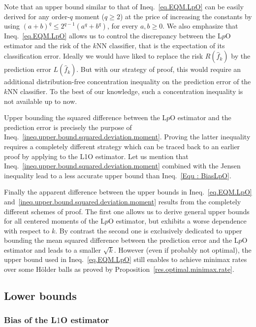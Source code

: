 \documentclass[twoside,11pt]{article}
\numberwithin{equation}{section}
\newcommand{\1}{\mathds{1}}%
\numberwithin{equation}{section}
\theoremstyle{plain}
\begin{document}
Note that an upper bound similar to that of Ineq.~\eqref{eq.EQM.LpO} can be easily derived for any order-$q$ moment ($q\geq 2$) at the price of increasing the constants by using $(a+b)^q \leq 2^{q-1} (a^q + b^q)$, for every $a,b\geq 0$.
%
We also emphasize that Ineq.~\eqref{eq.EQM.LpO} allows us to control the discrepancy between the L$p$O estimator and the risk of the $k$NN classifier, that is the expectation of its classification error.
%
Ideally we would have liked to replace the risk $R(\hat f_k)$ by the prediction error $L(\hat f_k)$. But with our strategy of proof, this would require an additional distribution-free concentration inequality on the prediction error of the $k$NN classifier. To the best of our knowledge, such a concentration inequality is not available up to now.


Upper bounding the squared difference between the L$p$O estimator and the prediction error is precisely the purpose of  Ineq.~\eqref{ineq.upper.bound.squared.deviation.moment}. Proving the latter inequality requires a completely different strategy which can be traced back to an earlier proof by \citet[][see the proof of Theorem~2.1]{RogersWagner78} applying to the L1O estimator.
%
Let us mention that Ineq.~\eqref{ineq.upper.bound.squared.deviation.moment} combined with the Jensen inequality lead to a less accurate upper bound than Ineq.~\eqref{Equ : BiasLpO}.

Finally the apparent difference between the upper bounds in Ineq.~\eqref{eq.EQM.LpO} and~\eqref{ineq.upper.bound.squared.deviation.moment} results from the completely different schemes of proof.
%
The first one allows us to derive general upper bounds for all centered moments of the L$p$O estimator, but exhibits a worse dependence with respect to $k$. By contrast the second one is exclusively dedicated to upper bounding the mean squared difference between the prediction error and the L$p$O estimator and leads to a smaller $\sqrt{k}$.
%
However (even if probably not optimal), the upper bound used in Ineq.~\eqref{eq.EQM.LpO} still enables to achieve minimax rates over some H\"older balls as proved by Proposition~\ref{res.optimal.minimax.rate}.






\subsection{Lower bounds}

\subsubsection{Bias of the L$1$O estimator}
\end{document}
